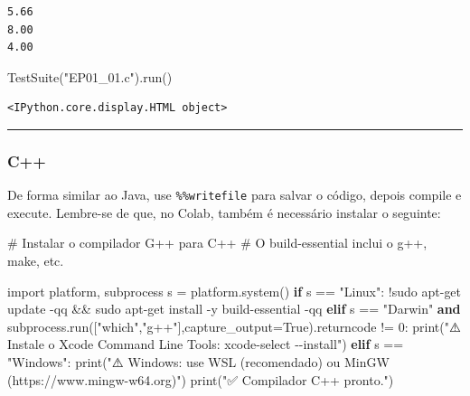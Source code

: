 \documentclass[
  portuguese,
  letterpaper,
  openany,
  oneside,
  12pt,
  a4paper]{book}
\newenvironment{Shaded}{\begin{snugshade}}{\end{snugshade}}
\newcommand{\BuiltInTok}[1]{\textcolor[rgb]{0.00,0.23,0.31}{#1}}
\newcommand{\CommentTok}[1]{\textcolor[rgb]{0.37,0.37,0.37}{#1}}
\newcommand{\ControlFlowTok}[1]{\textcolor[rgb]{0.00,0.23,0.31}{\textbf{#1}}}
\newcommand{\DecValTok}[1]{\textcolor[rgb]{0.68,0.00,0.00}{#1}}
\newcommand{\ImportTok}[1]{\textcolor[rgb]{0.00,0.46,0.62}{#1}}
\newcommand{\KeywordTok}[1]{\textcolor[rgb]{0.00,0.23,0.31}{\textbf{#1}}}
\newcommand{\NormalTok}[1]{\textcolor[rgb]{0.00,0.23,0.31}{#1}}
\newcommand{\OperatorTok}[1]{\textcolor[rgb]{0.37,0.37,0.37}{#1}}
\newcommand{\StringTok}[1]{\textcolor[rgb]{0.13,0.47,0.30}{#1}}
\newcommand{\VariableTok}[1]{\textcolor[rgb]{0.07,0.07,0.07}{#1}}
\begin{document}
\begin{verbatim}
5.66
8.00
4.00
\end{verbatim}

\begin{Shaded}
\begin{Highlighting}[]
\NormalTok{TestSuite(}\StringTok{"EP01\_01.c"}\NormalTok{).run()}
\end{Highlighting}
\end{Shaded}

\begin{verbatim}
<IPython.core.display.HTML object>
\end{verbatim}

\begin{center}\rule{0.5\linewidth}{0.5pt}\end{center}

\subsubsection{\texorpdfstring{ C++}{ C++}}\label{c-1}

De forma similar ao Java, use \texttt{\%\%writefile} para salvar o
código, depois compile e execute. Lembre-se de que, no Colab, também é
necessário instalar o seguinte:

\begin{Shaded}
\begin{Highlighting}[]
\CommentTok{\# Instalar o compilador G++ para C++}
\CommentTok{\# O build{-}essential inclui o g++, make, etc.}

\ImportTok{import}\NormalTok{ platform, subprocess}
\NormalTok{s }\OperatorTok{=}\NormalTok{ platform.system()}
\ControlFlowTok{if}\NormalTok{ s }\OperatorTok{==} \StringTok{"Linux"}\NormalTok{:}
    \OperatorTok{!}\NormalTok{sudo apt}\OperatorTok{{-}}\NormalTok{get update }\OperatorTok{{-}}\NormalTok{qq }\OperatorTok{\&\&}\NormalTok{ sudo apt}\OperatorTok{{-}}\NormalTok{get install }\OperatorTok{{-}}\NormalTok{y build}\OperatorTok{{-}}\NormalTok{essential }\OperatorTok{{-}}\NormalTok{qq}
\ControlFlowTok{elif}\NormalTok{ s }\OperatorTok{==} \StringTok{"Darwin"} \KeywordTok{and}\NormalTok{ subprocess.run([}\StringTok{"which"}\NormalTok{,}\StringTok{"g++"}\NormalTok{],capture\_output}\OperatorTok{=}\VariableTok{True}\NormalTok{).returncode }\OperatorTok{!=} \DecValTok{0}\NormalTok{:}
    \BuiltInTok{print}\NormalTok{(}\StringTok{"⚠️ Instale o Xcode Command Line Tools: xcode{-}select {-}{-}install"}\NormalTok{)}
\ControlFlowTok{elif}\NormalTok{ s }\OperatorTok{==} \StringTok{"Windows"}\NormalTok{:}
    \BuiltInTok{print}\NormalTok{(}\StringTok{"⚠️ Windows: use WSL (recomendado) ou MinGW (https://www.mingw{-}w64.org)"}\NormalTok{)}
\BuiltInTok{print}\NormalTok{(}\StringTok{"✅ Compilador C++ pronto."}\NormalTok{)}
\end{Highlighting}
\end{Shaded}
\end{document}
